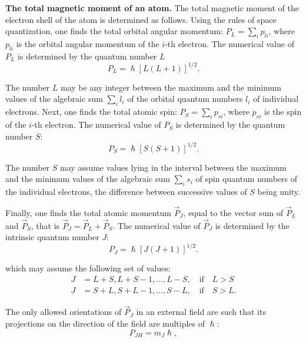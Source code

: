 \textbf{The total magnetic moment of an atom.} The total magnetic moment of the electron shell of the atom is determined as follows. Using the rules of space quantization, one finds the total orbital angular momentum: $P_L=\sum_i p_{li}$, where $p_{li}$ is the orbital angular momentum of the $i$-th electron. The numerical value of $P_L$ is determined by the quantum number $L$
\begin{equation}\label{eq:7_27}
    P_L = \hslash [L (L + 1)]^{1/2}.
\end{equation}

\noindent
The number $L$ may be any integer between the maximum and the minimum values of the algebraic sum $\sum_i l_i$ of the orbital quantum numbers $l_i$ of individual electrons. Next, one finds the total atomic spin: $P_S=\sum_i p_{si}$, where $p_{si}$ is the spin of the $i$-th electron. The numerical value of $P_S$ is determined by the quantum number $S$:
\begin{equation}\label{eq:7_28}
    P_S = \hslash [S (S + 1)]^{1/2}.
\end{equation}

\noindent
The number $S$ may assume values lying in the interval between the maximum and the minimum values of the algebraic sum $\sum_i s_i$ of spin quantum numbers of the individual electrons, the difference between successive values of $S$ being unity.

Finally, one finds the total atomic momentum $\vec{P}_J$, equal to the vector sum of $\vec{P}_L$ and $\vec{P}_S$, that is $\vec{P}_J=\vec{P}_L+\vec{P}_S$. The numerical value of $\vec{P}_J$ is determined by the intrinsic quantum number $J$:
\begin{equation}\label{eq:7_29}
    P_J = \hslash [J (J + 1)]^{1/2}.
\end{equation}

\noindent
which may assume the following set of values:
\begin{equation}\label{eq:7_30}
    \begin{split}
        J &= L+S, L+S-1, \ldots, L-S, \quad\text{if}\quad L>S\\
        J &= S+L, S+L-1, \ldots, S-L, \quad\text{if}\quad S>L.
    \end{split}
\end{equation}

\noindent
The only allowed orientations of $\vec{P}_J$ in an external field are such that its projections on the direction of the field are multiples of $\hslash$:
\begin{equation}\label{eq:7_31}
    P_{JH} = m_J \hslash,
\end{equation}

